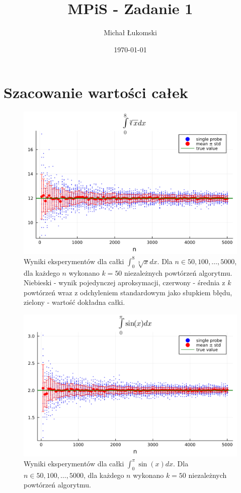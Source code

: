 \documentclass{article}
\title{MPiS - Zadanie 1}
\author{Michał Łukomski}
\date{\today}
\begin{document}
\maketitle

\section{Szacowanie wartości całek}

\begin{figure}[!h]
    \centering
    \includegraphics[width=\linewidth]{results/z1_1.png}
    \caption{Wyniki eksperymentów dla całki $\int_0^8 \sqrt[3]{x} dx$. Dla $n \in {50, 100, \dots, 5000}$, dla każdego $n$ wykonano $k=50$ niezależnych powtórzeń algorytmu. Niebieski - wynik pojedynczej aproksymacji, czerwony - średnia z $k$ powtórzeń wraz z odchyleniem standardowym jako słupkiem błędu, zielony - wartość dokładna całki.}
\end{figure}

\begin{figure}[!h]
    \centering
    \includegraphics[width=\linewidth]{results/z1_2.png}
    \caption{Wyniki eksperymentów dla całki $\int_0^{\pi} \sin(x) dx$. Dla $n \in {50, 100, \dots, 5000}$, dla każdego $n$ wykonano $k=50$ niezależnych powtórzeń algorytmu.}
\end{figure}
\end{document}
